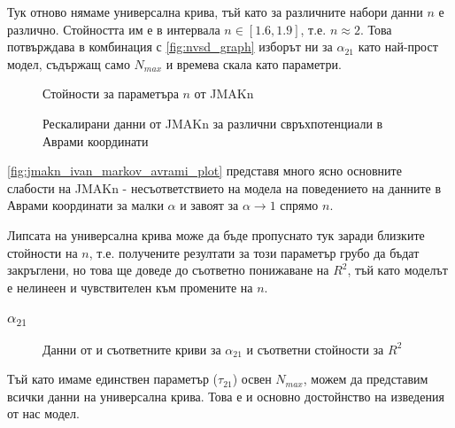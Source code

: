 Тук отново нямаме универсална крива, тъй като за различните набори данни $n$ е различно. Стойността им е в интервала $n \in [1.6, 1.9]$, т.е. $n \approx 2$. Това потвърждава в комбинация с \autoref{fig:nvsd_graph} изборът ни за $\alpha_{21}$ като най-прост модел, съдържащ само $N_{max}$ и времева скала като параметри.
\begin{figure}[H]
    \centering
    \caption{Стойности за параметъра $n$ от JMAKn}
\end{figure}
\begin{figure}[H]
    \centering
    \caption{Рескалирани данни от JMAKn за различни свръхпотенциали в Аврами координати}
    \label{fig:jmakn_ivan_markov_avrami_plot}
\end{figure}
\autoref{fig:jmakn_ivan_markov_avrami_plot} представя много ясно основните слабости на JMAKn - несъответствието на модела на поведението на данните в Аврами координати за малки $\alpha$ и завоят за $\alpha \rightarrow 1$ спрямо $n$.

Липсата на универсална крива може да бъде пропуснато тук заради близките стойности на $n$, т.е. получените резултати за този параметър грубо да бъдат закръглени, но това ще доведе до съответно понижаване на $R^2$, тъй като моделът е нелинеен и чувствителен към промените на $n$.
\subsubsection{\texorpdfstring{$\alpha_{21}$}{α21}}
\begin{figure}[H]
    \centering
    \caption{Данни от \cite{Markov1976} и съответните криви за $\alpha_{21}$ и съответни стойности за $R^2$}
\end{figure}

Тъй като имаме единствен параметър ($\tau_{21}$) освен $N_{max}$, можем да представим всички данни на универсална крива. Това е и основно достойнство на изведения от нас модел.

